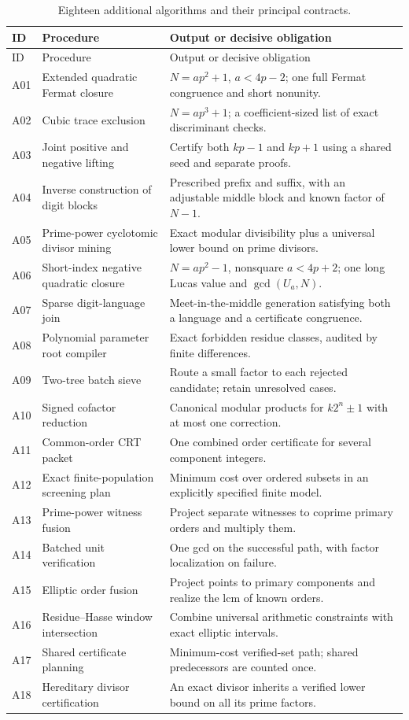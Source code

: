 \documentclass[11pt,a4paper]{article}
\theoremstyle{definition}\newtheorem{definition}[theorem]{Definition}
\theoremstyle{remark}\newtheorem{remark}[theorem]{Remark}
\begin{document}
{\small
\begin{longtable}{@{}p{}p{}p{}@{}}
\caption{Eighteen additional algorithms and their principal contracts.}
\label{tab:new-catalogue}\\
\toprule
ID & Procedure & Output or decisive obligation\\
\midrule\endfirsthead
\toprule ID & Procedure & Output or decisive obligation\\
\midrule\endhead
\bottomrule\endfoot
A01 & Extended quadratic Fermat closure &
$N=ap^2+1$, $a<4p-2$; one full Fermat congruence and short nonunity.\\
A02 & Cubic trace exclusion &
$N=ap^3+1$; a coefficient-sized list of exact discriminant checks.\\
A03 & Joint positive and negative lifting &
Certify both $kp-1$ and $kp+1$ using a shared seed and separate proofs.\\
A04 & Inverse construction of digit blocks &
Prescribed prefix and suffix, with an adjustable middle block and known
factor of $N-1$.\\
A05 & Prime-power cyclotomic divisor mining &
Exact modular divisibility plus a universal lower bound on prime divisors.\\
A06 & Short-index negative quadratic closure &
$N=ap^2-1$, nonsquare $a<4p+2$; one long Lucas value and $\gcd(U_a,N)$.\\
\midrule
A07 & Sparse digit-language join &
Meet-in-the-middle generation satisfying both a language and a certificate
congruence.\\
A08 & Polynomial parameter root compiler &
Exact forbidden residue classes, audited by finite differences.\\
A09 & Two-tree batch sieve &
Route a small factor to each rejected candidate; retain unresolved cases.\\
A10 & Signed cofactor reduction &
Canonical modular products for $k2^n\pm1$ with at most one correction.\\
A11 & Common-order CRT packet &
One combined order certificate for several component integers.\\
A12 & Exact finite-population screening plan &
Minimum cost over ordered subsets in an explicitly specified finite model.\\
\midrule
A13 & Prime-power witness fusion &
Project separate witnesses to coprime primary orders and multiply them.\\
A14 & Batched unit verification &
One gcd on the successful path, with factor localization on failure.\\
A15 & Elliptic order fusion &
Project points to primary components and realize the lcm of known orders.\\
A16 & Residue--Hasse window intersection &
Combine universal arithmetic constraints with exact elliptic intervals.\\
A17 & Shared certificate planning &
Minimum-cost verified-set path; shared predecessors are counted once.\\
A18 & Hereditary divisor certification &
An exact divisor inherits a verified lower bound on all its prime factors.\\
\end{longtable}}
\end{document}
